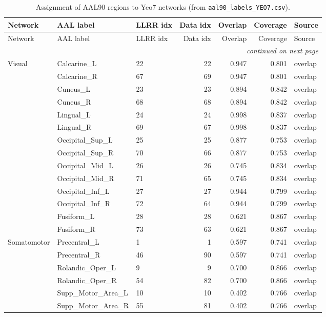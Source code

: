 \documentclass[a4paper,10pt]{article}
\begin{document}
\begingroup\small\setlength{\tabcolsep}{4pt}
\begin{longtable}{lllrrrl}
\caption{Assignment of AAL90 regions to Yeo7 networks (from \texttt{aal90\_labels\_YEO7.csv}).}
\label{tab:yeo7}\\
\toprule
Network & AAL label & LLRR idx & Data idx & Overlap & Coverage & Source \\
\midrule
\endfirsthead
\toprule
Network & AAL label & LLRR idx & Data idx & Overlap & Coverage & Source \\
\midrule
\endhead
\midrule
\multicolumn{7}{r}{\emph{continued on next page}} \\
\endfoot
\bottomrule
\endlastfoot
Visual & Calcarine\_L & 22 & 22 & 0.947 & 0.801 & overlap \\
 & Calcarine\_R & 67 & 69 & 0.947 & 0.801 & overlap \\
 & Cuneus\_L & 23 & 23 & 0.894 & 0.842 & overlap \\
 & Cuneus\_R & 68 & 68 & 0.894 & 0.842 & overlap \\
 & Lingual\_L & 24 & 24 & 0.998 & 0.837 & overlap \\
 & Lingual\_R & 69 & 67 & 0.998 & 0.837 & overlap \\
 & Occipital\_Sup\_L & 25 & 25 & 0.877 & 0.753 & overlap \\
 & Occipital\_Sup\_R & 70 & 66 & 0.877 & 0.753 & overlap \\
 & Occipital\_Mid\_L & 26 & 26 & 0.745 & 0.834 & overlap \\
 & Occipital\_Mid\_R & 71 & 65 & 0.745 & 0.834 & overlap \\
 & Occipital\_Inf\_L & 27 & 27 & 0.944 & 0.799 & overlap \\
 & Occipital\_Inf\_R & 72 & 64 & 0.944 & 0.799 & overlap \\
 & Fusiform\_L & 28 & 28 & 0.621 & 0.867 & overlap \\
 & Fusiform\_R & 73 & 63 & 0.621 & 0.867 & overlap \\
\midrule
Somatomotor & Precentral\_L & 1 & 1 & 0.597 & 0.741 & overlap \\
 & Precentral\_R & 46 & 90 & 0.597 & 0.741 & overlap \\
 & Rolandic\_Oper\_L & 9 & 9 & 0.700 & 0.866 & overlap \\
 & Rolandic\_Oper\_R & 54 & 82 & 0.700 & 0.866 & overlap \\
 & Supp\_Motor\_Area\_L & 10 & 10 & 0.402 & 0.766 & overlap \\
 & Supp\_Motor\_Area\_R & 55 & 81 & 0.402 & 0.766 & overlap \\

\end{longtable}
\end{document}

